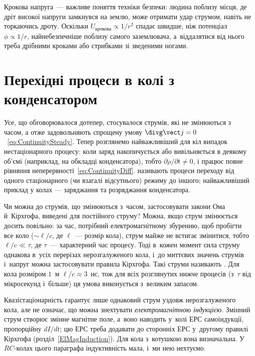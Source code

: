 Крокова напруга~--- важливе поняття техніки безпеки: людина поблизу місця, де дріт
високої напруги замкнувся на землю, може отримати удар струмом, навіть не торкаючись
дроту. Оскільки $U_\text{крокова}\propto 1/r^2$ спадає швидше, ніж потенціал
$\phi\propto 1/r$, найнебезпечніше поблизу самого заземлювача, а~віддалятися від нього
треба дрібними кроками або стрибками зі зведеними ногами.

\section{Перехідні процеси в колі з конденсатором}\label{sec:CapacitorTransient}\hypertarget{capacitor-transient-process}{}

Усе, що обговорювалося дотепер, стосувалося  струмів, які не змінюються з часом, а отже задовольняють спрощену умову $\divg\vect j=0$~\eqref{eq:ContinuitySteady}. Тепер розглянемо найважливіший для кіл випадок нестаціонарного процесу: коли заряд накопичується або вивільняється в деякому об'ємі (наприклад, на обкладці конденсатора), тобто $\partial\rho/\partial t\neq 0$, і працює повне рівняння неперервності~\eqref{eq:ContinuityDiff}.  називають процеси переходу від одного стаціонарного (чи взагалі відсутнього) режиму до іншого; найважливіший приклад у колах --- заряджання та розряджання конденсатора.

Чи можна до струмів, що змінюються з~часом, застосовувати закони Ома й~Кірхгофа, виведені для постійного струму? Можна, якщо струм
змінюється досить повільно: за час, потрібний електромагнітному збуренню, щоб пробігти все коло ($\sim\ell/c$, де $\ell$~--- розмір кола),
струм майже не встигає змінитися, тобто $\ell/c \ll \tau$, де $\tau$~--- характерний час процесу. Тоді в~кожен момент сила струму однакова
в~усіх перерізах нерозгалуженого кола, і~до миттєвих значень струмів і~напруг можна застосовувати правила Кірхгофа. Такі струми
називають . Для кола розміром $1$~м $\ell/c \approx 3$~нс, тож для всіх
розглянутих нижче процесів (з~$\tau$ від мікросекунд і~більше) ця умова виконується з~великим запасом.

Квазістаціонарність гарантує лише однаковий струм уздовж нерозгалуженого кола, але не означає, що можна знехтувати
\emph{електромагнітною індукцією}. Змінний струм створює змінне магнітне поле, а~воно наводить у~колі ЕРС самоіндукції,
пропорційну $dI/dt$; цю ЕРС треба додавати до сторонніх ЕРС у~другому правилі Кірхгофа (розділ~\ref{ElMagInduction}). Для кола
з~котушкою вона визначальна. У~$RC$-колах цього параграфа індуктивність мала, і~ми нею нехтуємо.


